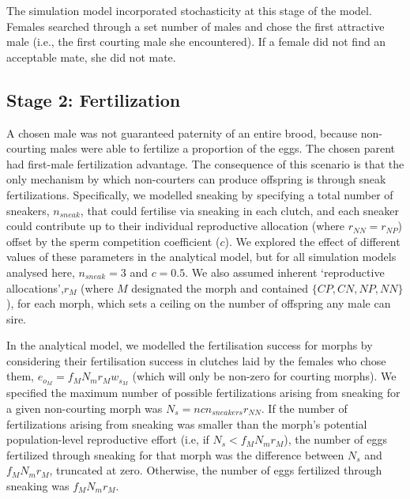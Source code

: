 \documentclass[
  11pt,
  a4paper,
]{article}
\begin{document}
The simulation model incorporated stochasticity at this stage of the
model. Females searched through a set number of males and chose the
first attractive male (i.e., the first courting male she encountered).
If a female did not find an acceptable mate, she did not mate.

\hypertarget{stage-2-fertilization}{%
\subsection{Stage 2: Fertilization}\label{stage-2-fertilization}}

A chosen male was not guaranteed paternity of an entire brood, because
non-courting males were able to fertilize a proportion of the eggs. The
chosen parent had first-male fertilization advantage. The consequence of
this scenario is that the only mechanism by which non-courters can
produce offspring is through sneak fertilizations. Specifically, we
modelled sneaking by specifying a total number of sneakers, \(n_{sneak}\),
that could fertilise via sneaking in each clutch, and each sneaker could
contribute up to their individual reproductive allocation (where
\(r_{NN} = r_{NP}\)) offset by the sperm competition coefficient (\(c\)). We
explored the effect of different values of these parameters in the
analytical model, but for all simulation models analysed here,
\(n_{sneak}=3\) and \(c=0.5\). We also assumed inherent `reproductive
allocations',\(r_M\) (where \(M\) designated the morph and contained
\(\{CP, CN, NP, NN\}\)), for each morph, which sets a ceiling on the
number of offspring any male can sire.

In the analytical model, we modelled the fertilisation success for
morphs by considering their fertilisation success in clutches laid by
the females who chose them, \(e_{o_M} = f_M N_m r_M w_{s_M}\) (which will
only be non-zero for courting morphs). We specified the maximum number
of possible fertilizations arising from sneaking for a given
non-courting morph was \(N_s = n c n_{sneakers} r_{NN}\). If the number of
fertilizations arising from sneaking was smaller than the morph's
potential population-level reproductive effort (i.e, if
\(N_s < f_M N_m r_M\)), the number of eggs fertilized through sneaking for
that morph was the difference between \(N_s\) and \(f_M N_m r_M\), truncated
at zero. Otherwise, the number of eggs fertilized through sneaking was
\(f_M N_m r_M\).
\end{document}
